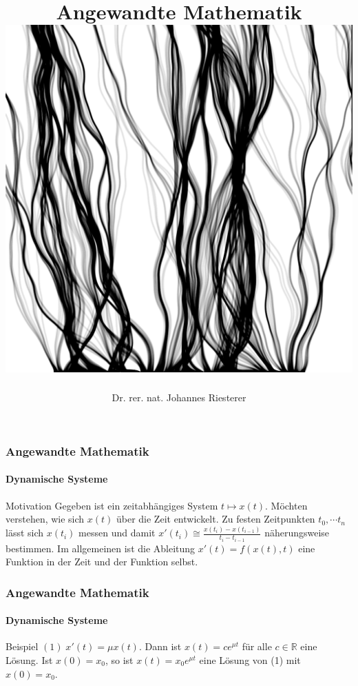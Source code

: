 \documentclass{beamer}
\begin{document}
\title[Angewandte Mathematik] %
{Angewandte Mathematik
\\
\includegraphics[scale=0.15]{images/cover}
}
\subtitle{}
\author[Dr. Johannes Riesterer] %
{Dr.  rer. nat. Johannes Riesterer}

\date[KPT 2004] %
{}

\subject{Angewandte Mathematik}




\begin{frame}
    \frametitle{Angewandte Mathematik}
\framesubtitle{Dynamische Systeme }
\begin{block}{Motivation}
Gegeben ist ein zeitabhängiges System $t \mapsto x(t)$. 
Möchten verstehen, wie sich $x(t)$ über die Zeit entwickelt. 
Zu festen Zeitpunkten $t_0, \cdots t_n $ lässt sich $x(t_i)$ messen und damit $x'(t_i) \cong \frac{x(t_i) - x(t_{i-1})}{t_i - t_{i-1}}$ näherungsweise bestimmen. Im allgemeinen ist die Ableitung $x'(t) = f(x(t), t)$ eine Funktion in der Zeit und der Funktion selbst. 
\end{block}
 \end{frame}

\begin{frame}
    \frametitle{Angewandte Mathematik}
\framesubtitle{Dynamische Systeme }
\begin{block}{Beispiel}
$(1) \;x'(t) = \mu x(t)$.  
Dann ist $x(t)= c e^{\mu t}$ für alle $c \in \mathbb{R}$ eine Lösung. Ist $x(0) = x_0$, so ist   $x(t)= x_0 e^{\mu t}$ eine Lösung von (1) mit $x(0) = x_0$. 
\end{block}
 \end{frame}
\end{document}

